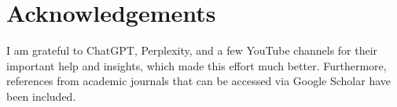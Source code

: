\documentclass{llncs}
\begin{document}
\section{Acknowledgements}
I am grateful to ChatGPT, Perplexity, and a few YouTube channels for their important help and insights, which made this effort much better. Furthermore, references from academic journals that can be accessed via Google Scholar have been included.
\end{document}
